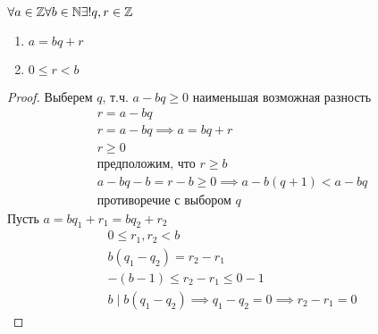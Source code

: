 \documentclass[main]{subfiles}
\begin{document}
\begin{theorem}
    $\forall a \in \mathbb{Z} \forall b \in \mathbb{N} \exists! q,r \in \mathbb{Z}$
    \begin{enumerate}
        \item $a=bq +r$
        \item $0 \le r < b$
    \end{enumerate}
\end{theorem}
\begin{proof}
    Выберем  $q$, т.ч. $a-bq\ge 0$ наименьшая возможная разность
    \begin{gather*}
        r = a-bq\\
        r = a -bq \implies a = bq+r\\
        r \ge 0\\
        \text{предположим, что } r \ge b\\
        a-bq-b=r-b \ge 0 \implies a - b(q+1) < a -bq\\
        \text{противоречие с выбором } q
    \end{gather*}
    Пусть $a = bq_1 + r_1 = bq_2+r_2$
    \begin{gather*}
        0 \le r_1, r_2 <b \\
        b(q_1-q_2) = r_2-r_1\\
        -(b-1)\le r_2 - r_1 \le 0-1\\
        b \mid b(q_1-q_2) \implies q_1-q_2 = 0 \implies r_2-r_1=0
    \end{gather*}
\end{proof}
\end{document}
